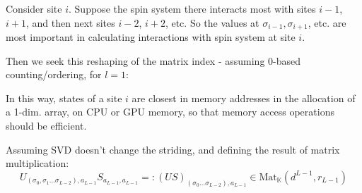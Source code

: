 Consider site $i$.  Suppose the spin system there interacts most with sites $i-1$, $i+1$, and then next sites $i-2$, $i+2$, etc.  So the values at $\sigma_{i-1}, \sigma_{i+1}$, etc. are most important in calculating interactions with spin system at site $i$.  

Then we seek this reshaping of the matrix index - assuming $0$-based counting/ordering, for $l=1$:

In this way, states of a site $i$ are closest in memory addresses in the allocation of a 1-dim. array, on CPU or GPU memory, so that memory access operations should be efficient.  

Assuming SVD doesn't change the striding, and defining the result of matrix multiplication:
\[
U_{(\sigma_0, \sigma_1 \dots \sigma_{L-2}), a_{L-1} } S_{a_{L-1}, a_{L-1}} =: (US)_{(\sigma_0 \dots \sigma_{L-2} ), a_{L-1} } \in \text{Mat}_{\mathbb{K}}(d^{L-1},r_{L-1} )
\]

